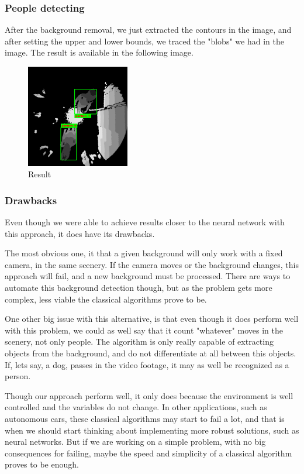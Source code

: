 \documentclass[conference]{IEEEtran}
\begin{document}
\subsubsection{People detecting}

After the background removal, we just extracted the contours in the image, and after setting  the upper and lower bounds, we traced the "blobs" we had in the image. The result is available in the following image.

\begin{figure}[ht!]
    \centering
    \includegraphics[width=0.4\textwidth]{Images/classical/163-result.png}
    \caption{Result}\label{fig:ir-results}
\end{figure}

\subsubsection{Drawbacks}

Even though we were able to achieve results closer to the neural network with this approach, it does have its drawbacks.

The most obvious one, it that a given background will only work with a fixed camera, in the same scenery. If the camera moves or the background changes, this approach will fail, and a new background must be processed. There are ways to automate this background detection though, but as the problem gets more complex, less viable the classical algorithms prove to be.

One other big issue with this alternative, is that even though it does perform well with this problem, we could as well say that it count "whatever" moves in the scenery, not only people. The algorithm is only really capable of extracting objects from the background, and do not differentiate at all between this objects. If, lets say, a dog, passes in the video footage, it may as well be recognized as a person.

Though our approach perform well, it only does because the environment is well controlled and the variables do not change. In other applications, such as autonomous cars, these classical algorithms may start to fail a lot, and that is when we should start thinking about implementing more robust solutions, such as neural networks. But if we are working on a simple problem, with no big consequences for failing, maybe the speed and simplicity of a classical algorithm proves to be enough.
\end{document}
